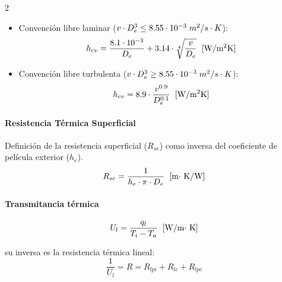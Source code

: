 \documentclass[11pt]{article}
\begin{document}
\begin{multicols*}{2}
            \begin{itemize}
                \item Convención libre laminar ($ v \cdot D_{e}^3 \leq 8.55 \cdot 10^{-3} \hspace {0.1cm} m^2/s \cdot K$):
                \begin{equation}
                    h_{cv} = \frac{8.1 \cdot 10^{-3}}{D_e} + 3.14 \cdot \sqrt[4]{\frac{v}{D_e}} \hspace{0.2cm} \text{[W/m$^2$K]}
                \end{equation}

                \item Convención libre turbulenta ($ v \cdot D_{e}^3 \geq 8.55 \cdot 10^{-3} \hspace {0.1cm} m^2/s \cdot K$):
                \begin{equation}
                    h_{cv} = 8.9 \cdot \frac{v^{0.9}}{D^{0.1}_e} \hspace{0.2cm} \text{[W/m$^2$K]}
                \end{equation}
            \end{itemize}
        
        \paragraph*{Resistencia Térmica Superficial}
            Definición de la resistencia superficial ($R_{se}$) como inversa del coeficiente de película exterior ($h_e$).
            \begin{equation}
                R_{se} = \frac{1}{h_e \cdot \pi \cdot D_e} \hspace{0.2cm} \text{[m$\cdot$ K/W]}
            \end{equation}
        
        \paragraph*{Transmitancia térmica}

            \begin{equation}
                U_l = \frac{q_l}{T_i - T_a} \hspace{0.2cm} \text{[W/m$\cdot$ K]}
            \end{equation}

            su inversa es la resistencia térmica lineal:
            \begin{equation}
                \frac{1}{U_l} = R = R_{lpi} + R_{lc} + R_{lpe}
            \end{equation}


\end{multicols*}
\end{document}
